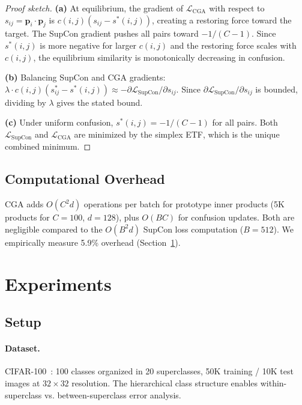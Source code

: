 \documentclass{article}
\newcommand{\lsupcon}{\mathcal{L}_{\text{SupCon}}}
\newcommand{\lcga}{\mathcal{L}_{\text{CGA}}}
\begin{document}
\begin{proof}[Proof sketch]
\textbf{(a)} At equilibrium, the gradient of $\lcga$ with respect to $s_{ij} = \mathbf{p}_i \cdot \mathbf{p}_j$ is $c(i,j)(s_{ij} - s^*(i,j))$, creating a restoring force toward the target. The SupCon gradient pushes all pairs toward $-1/(C-1)$. Since $s^*(i,j)$ is more negative for larger $c(i,j)$ and the restoring force scales with $c(i,j)$, the equilibrium similarity is monotonically decreasing in confusion.

\textbf{(b)} Balancing SupCon and CGA gradients: $\lambda \cdot c(i,j)(s^*_{ij} - s^*(i,j)) \approx -\partial \lsupcon / \partial s_{ij}$. Since $\partial \lsupcon / \partial s_{ij}$ is bounded, dividing by $\lambda$ gives the stated bound.

\textbf{(c)} Under uniform confusion, $s^*(i,j) = -1/(C-1)$ for all pairs. Both $\lsupcon$ and $\lcga$ are minimized by the simplex ETF, which is the unique combined minimum.
\end{proof}

\subsection{Computational Overhead}

CGA adds $O(C^2 d)$ operations per batch for prototype inner products (5K products for $C=100$, $d=128$), plus $O(BC)$ for confusion updates. Both are negligible compared to the $O(B^2 d)$ SupCon loss computation ($B=512$). We empirically measure 5.9\% overhead (Section~\ref{sec:experiments}).

\section{Experiments}
\label{sec:experiments}

\subsection{Setup}

\paragraph{Dataset.} CIFAR-100~\citep{krizhevsky2009learning}: 100 classes organized in 20 superclasses, 50K training / 10K test images at $32 \times 32$ resolution. The hierarchical class structure enables within-superclass vs. between-superclass error analysis.
\end{document}
